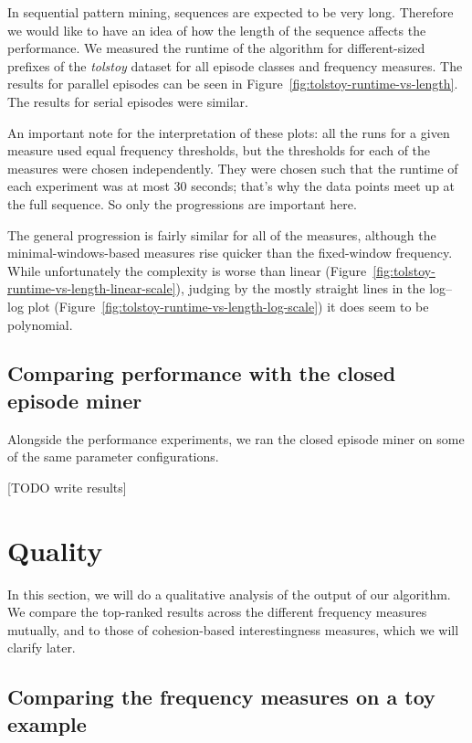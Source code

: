 In sequential pattern mining, sequences are expected to be very long. Therefore we would like to have an idea of how the length of the sequence affects the performance. We measured the runtime of the algorithm for different-sized prefixes of the \emph{tolstoy} dataset for all episode classes and frequency measures. The results for parallel episodes can be seen in Figure~\ref{fig:tolstoy-runtime-vs-length}. The results for serial episodes were similar.

An important note for the interpretation of these plots: all the runs for a given measure used equal frequency thresholds, but the thresholds for each of the measures were chosen independently. They were chosen such that the runtime of each experiment was at most 30 seconds; that's why the data points meet up at the full sequence. So only the progressions are important here.

The general progression is fairly similar for all of the measures, although the minimal-windows-based measures rise quicker than the fixed-window frequency. While unfortunately the complexity is worse than linear (Figure~\ref{fig:tolstoy-runtime-vs-length-linear-scale}), judging by the mostly straight lines in the log--log plot (Figure~\ref{fig:tolstoy-runtime-vs-length-log-scale}) it does seem to be polynomial.

\subsection{Comparing performance with the closed episode miner}

Alongside the performance experiments, we ran the closed episode miner on some of the same parameter configurations.

[TODO write results]




\section{Quality}

In this section, we will do a qualitative analysis of the output of our algorithm. We compare the top-ranked results across the different frequency measures mutually, and to those of cohesion-based interestingness measures, which we will clarify later.

\iffalse
\subsection{Comparing the frequency measures on a toy example}

